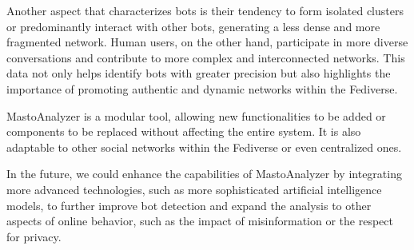Another aspect that characterizes bots is their tendency to form isolated clusters or predominantly interact with other bots, generating a less dense and more fragmented network. Human users, on the other hand, participate in more diverse conversations and contribute to more complex and interconnected networks. This data not only helps identify bots with greater precision but also highlights the importance of promoting authentic and dynamic networks within the Fediverse.

MastoAnalyzer is a modular tool, allowing new functionalities to be added or components to be replaced without affecting the entire system. It is also adaptable to other social networks within the Fediverse or even centralized ones.

In the future, we could enhance the capabilities of MastoAnalyzer by integrating more advanced technologies, such as more sophisticated artificial intelligence models, to further improve bot detection and expand the analysis to other aspects of online behavior, such as the impact of misinformation or the respect for privacy.



